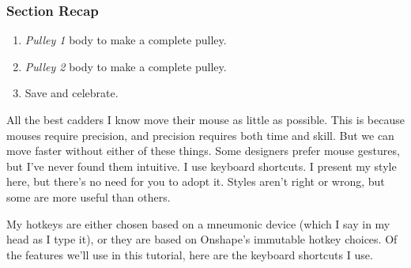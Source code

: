\subsubsection{Section Recap}

\begin{enumerate}
\item{}  \emph{Pulley 1} body to make a complete pulley.
\item{}  \emph{Pulley 2} body to make a complete pulley.
\item{} Save and celebrate.
\end{enumerate}

\begin{aside}
\label{box:keyboard_shortcuts}

All the best cadders I know move their mouse as little as possible. This is
because mouses require precision, and precision requires both time and skill.
But we can move faster without either of these things. Some designers prefer
mouse gestures, but I've never found them intuitive. I use keyboard shortcuts. I present my style here, but there's no need for you to adopt it. Styles aren't
right or wrong, but some are more useful than others.

My hotkeys are either chosen based on a mneumonic device (which I say in my head
as I type it), or they are based on Onshape's immutable hotkey choices. Of the features we'll use in this tutorial, here are the keyboard shortcuts I use.


\end{aside}
